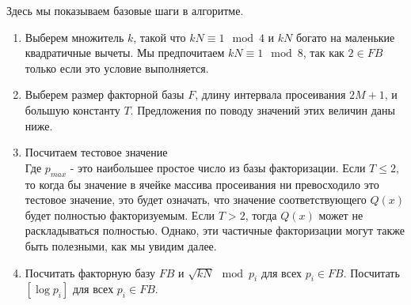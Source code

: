 \documentclass[a4paper,12pt]{report}
\begin{document}
Здесь мы показываем базовые шаги в алгоритме.
\begin{enumerate}[label=\roman*]
	\item  Выберем множитель $k$, такой что $kN \equiv 1 \mod 4$ и $kN$ богато на маленькие квадратичные вычеты. Мы предпочитаем $kN \equiv 1 \mod 8$, так как $2 \in FB$ только если это условие выполняется. \label{romi}
	\item Выберем размер факторной базы $F$, длину интервала просеивания $2M + 1$, и большую константу $T$. Предложения по поводу значений этих величин даны ниже. \label{romii}
	\item Посчитаем тестовое значение \label{romiii}
	\begin{equation*}
	[\log{\frac{M\sqrt{kN/2}}{p_{max}^T}}]
	\end{equation*}
Где $p_{max}$ - это наибольшее простое число из базы факторизации. Если $T \leq 2$, то когда бы значение в ячейке массива просеивания ни превосходило это тестовое значение, это будет означать, что значение соответствующего $Q(x)$ будет полностью факторизуемым. Если $T > 2$, тогда $Q(x)$ может не раскладываться полностью. Однако, эти частичные факторизации могут также быть полезными, как мы увидим далее.
	\item Посчитать факторную базу $FB$ и $\sqrt{kN} \mod p_i$ для всех $p_i \in FB$. Посчитать $[\log{p_i}]$ для всех $p_i \in FB$. \label{romiv}


\end{enumerate}
\end{document}
